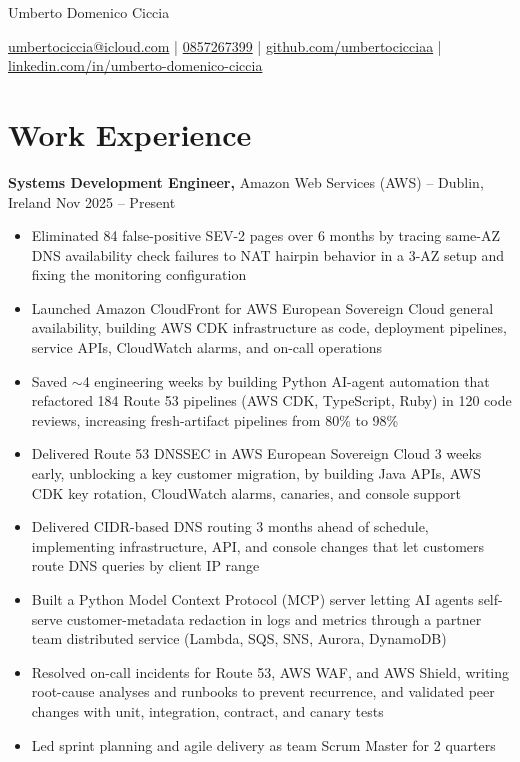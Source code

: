 \documentclass[11pt]{article}       %
\begin{document}
\centerline{\Large Umberto Domenico Ciccia}

\vspace{5pt}

\centerline{\href{mailto:umbertociccia@icloud.com}{umbertociccia@icloud.com} | \href{tel:+353857267399}{0857267399} | \href{https://github.com/umbertocicciaa}{github.com/umbertocicciaa} | \href{https://linkedin.com/in/umberto-domenico-ciccia}{linkedin.com/in/umberto-domenico-ciccia}}

\vspace{-10pt}

\section*{Work Experience}
\textbf{Systems Development Engineer,} {Amazon Web Services (AWS)} -- Dublin, Ireland \hfill Nov 2025 -- Present \\
\vspace{-9pt}
\begin{itemize}
  \item Eliminated 84 false-positive SEV-2 pages over 6 months by tracing same-AZ DNS availability check failures to NAT hairpin behavior in a 3-AZ setup and fixing the monitoring configuration
  \item Launched Amazon CloudFront for AWS European Sovereign Cloud general availability, building AWS CDK infrastructure as code, deployment pipelines, service APIs, CloudWatch alarms, and on-call operations
  \item Saved $\sim$4 engineering weeks by building Python AI-agent automation that refactored 184 Route 53 pipelines (AWS CDK, TypeScript, Ruby) in 120 code reviews, increasing fresh-artifact pipelines from 80\% to 98\%
  \item Delivered Route 53 DNSSEC in AWS European Sovereign Cloud 3 weeks early, unblocking a key customer migration, by building Java APIs, AWS CDK key rotation, CloudWatch alarms, canaries, and console support
  \item Delivered CIDR-based DNS routing 3 months ahead of schedule, implementing infrastructure, API, and console changes that let customers route DNS queries by client IP range
  \item Built a Python Model Context Protocol (MCP) server letting AI agents self-serve customer-metadata redaction in logs and metrics through a partner team distributed service (Lambda, SQS, SNS, Aurora, DynamoDB)
  \item Resolved on-call incidents for Route 53, AWS WAF, and AWS Shield, writing root-cause analyses and runbooks to prevent recurrence, and validated peer changes with unit, integration, contract, and canary tests
  \item Led sprint planning and agile delivery as team Scrum Master for 2 quarters
\end{itemize}
\end{document}
